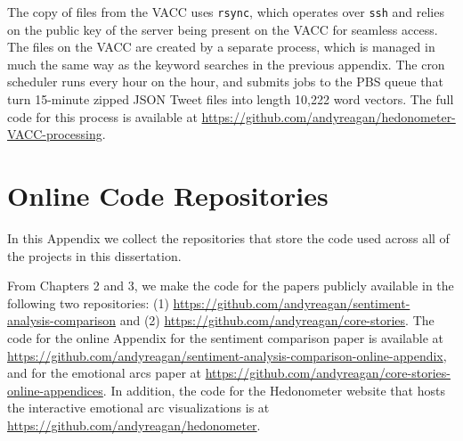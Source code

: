 The copy of files from the VACC uses \verb|rsync|, 
which operates over \verb|ssh| 
and relies on the public key of the server being present on the VACC for seamless access.
The files on the VACC are created by a separate process, 
which is managed in much the same way as the keyword searches in the previous appendix.
The cron scheduler runs every hour on the hour, 
and submits jobs to the PBS queue that turn 15-minute zipped JSON Tweet files into length 10,222 word vectors.
The full code for this process is available at 
\href{https://github.com/andyreagan/hedonometer-VACC-processing}{https://github.com/andyreagan/hedonometer-VACC-processing}.







\chapter{Online Code Repositories}

In this Appendix we collect the repositories that store the code used across all of the projects in this dissertation.

From Chapters 2 and 3, we make the code for the papers publicly available in the following two repositories:
(1)
\href{https://github.com/andyreagan/sentiment-analysis-comparison}{https://github.com/andyreagan/sentiment-analysis-comparison}
and (2)
\href{https://github.com/andyreagan/core-stories}{https://github.com/andyreagan/core-stories}.
The code for the online Appendix for the sentiment comparison paper is available at \href{https://github.com/andyreagan/sentiment-analysis-comparison-online-appendix}{https://github.com/andyreagan/sentiment-analysis-comparison-online-appendix}, and for the emotional arcs paper at \href{https://github.com/andyreagan/core-stories-online-appendices}{https://github.com/andyreagan/core-stories-online-appendices}.
In addition, the code for the Hedonometer website that hosts the interactive emotional arc visualizations is at \href{https://github.com/andyreagan/hedonometer}{https://github.com/andyreagan/hedonometer}.

